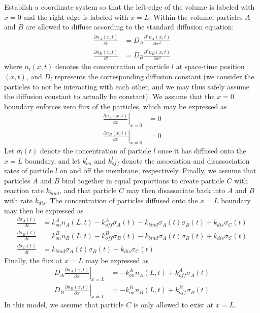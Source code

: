 \documentclass[aps, prl, preprint]{revtex4-1}
\begin{document}
Establish a coordinate system so that the left-edge of the volume is labeled with $x=0$ and the right-edge is labeled with $x=L$. Within the volume, particles $A$ and $B$ are allowed to diffuse according to the standard diffusion equation:
\begin{subequations}\label{eq:diffusion}
\begin{align}
\frac{\partial n_A(x,t)}{\partial t} &= D_A \frac{\partial^2 n_A(x,t)}{\partial x^2}\\
\frac{\partial n_B(x,t)}{\partial t} &= D_B \frac{\partial^2 n_B(x,t)}{\partial x^2}
\end{align}
\end{subequations}
where $n_l(x,t)$ denotes the concentration of particle $l$ at space-time position $(x,t)$, and $D_l$ represents the corresponding diffusion constant (we consider the particles to not be interacting with each other, and we may thus safely assume the diffusion constant to actually be constant). We assume that the $x=0$ boundary enforces zero flux of the particles, which may be expressed as
\begin{subequations}\label{eq:lb}
\begin{align}
\left . \frac{\partial n_A(x,t)}{\partial x}\right |_{x=0} &= 0\\
\left . \frac{\partial n_B(x,t)}{\partial x}\right |_{x=0} &= 0
\end{align}
\end{subequations}
Let $\sigma_l(t)$ denote the concentration of particle $l$ once it has diffused onto the $x=L$ boundary, and let $k_{on}^l$ and $k_{off}^l$ denote the association and disassociation rates of particle $l$ on and off the membrane, respectively. Finally, we assume that particles $A$ and $B$ bind together in equal proportions to create particle $C$ with reaction rate $k_{bind}$, and that particle $C$ may then disassociate back into $A$ and $B$ with rate $k_{dis}$. The concentration of particles diffused onto the $x=L$ boundary may then be expressed as
\begin{subequations}\label{eq:surfdensity}
\begin{align}
\frac{d \sigma_A(t)}{d t} &= k_{on}^A n_A(L,t) -k_{off}^A \sigma_A(t) - k_{bind}\sigma_A(t)\sigma_B(t) + k_{dis}\sigma_C(t)\\
\frac{d \sigma_B(t)}{d t} &= k_{on}^B n_B(L,t) -k_{off}^B \sigma_B(t) - k_{bind}\sigma_A(t)\sigma_B(t) + k_{dis}\sigma_C(t)\\
\frac{d \sigma_C(t)}{d t} &= k_{bind}\sigma_A(t)\sigma_B(t) - k_{dis}\sigma_C(t)
\end{align}
\end{subequations}
Finally, the flux at $x=L$ may be expressed as
\begin{subequations}\label{eq:rb}
\begin{align}
\left . D_A\frac{\partial n_A(x,t)}{\partial x}\right |_{x=L} &= -k_{on}^A n_A(L,t) + k_{off}^A\sigma_A(t)\\
\left . D_B\frac{\partial n_B(x,t)}{\partial x}\right |_{x=L} &= -k_{on}^B n_B(L,t) + k_{off}^B\sigma_B(t)
\end{align}
\end{subequations}
In this model, we assume that particle $C$ is only allowed to exist at $x=L$.
\end{document}
